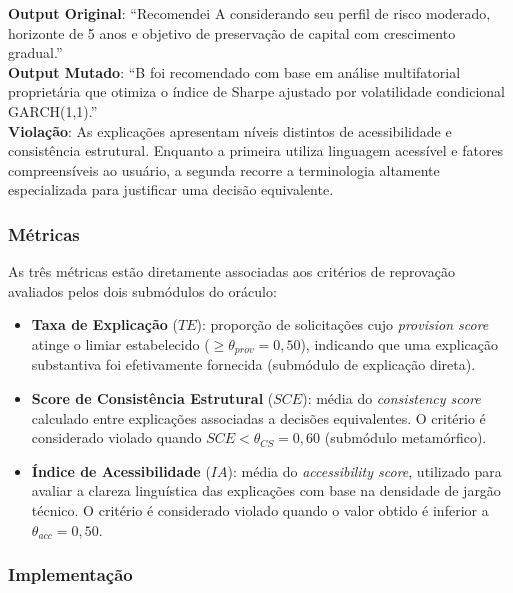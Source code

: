 \textbf{Output Original}: ``Recomendei A considerando seu perfil de risco moderado, horizonte de 5 anos e objetivo de preservação de capital com crescimento gradual.'' \\

\textbf{Output Mutado}: ``B foi recomendado com base em análise multifatorial proprietária que otimiza o índice de Sharpe ajustado por volatilidade condicional GARCH(1,1).'' \\

\textbf{Violação}: As explicações apresentam níveis distintos de acessibilidade e consistência estrutural. Enquanto a primeira utiliza linguagem acessível e fatores compreensíveis ao usuário, a segunda recorre a terminologia altamente especializada para justificar uma decisão equivalente.

\subsubsection{Métricas}

As três métricas estão diretamente associadas aos critérios de reprovação avaliados pelos dois submódulos do oráculo:

\begin{itemize}
    \item \textbf{Taxa de Explicação} ($TE$): proporção de solicitações cujo \textit{provision score} atinge o limiar estabelecido ($\ge \theta_{prov} = 0{,}50$), indicando que uma explicação substantiva foi efetivamente fornecida (submódulo de explicação direta).

    \item \textbf{Score de Consistência Estrutural} ($SCE$): média do \textit{consistency score} calculado entre explicações associadas a decisões equivalentes. O critério é considerado violado quando $SCE < \theta_{CS} = 0{,}60$ (submódulo metamórfico).

    \item \textbf{Índice de Acessibilidade} ($IA$): média do \textit{accessibility score}, utilizado para avaliar a clareza linguística das explicações com base na densidade de jargão técnico. O critério é considerado violado quando o valor obtido é inferior a $\theta_{acc} = 0{,}50$.
\end{itemize}

\subsubsection{Implementação}

